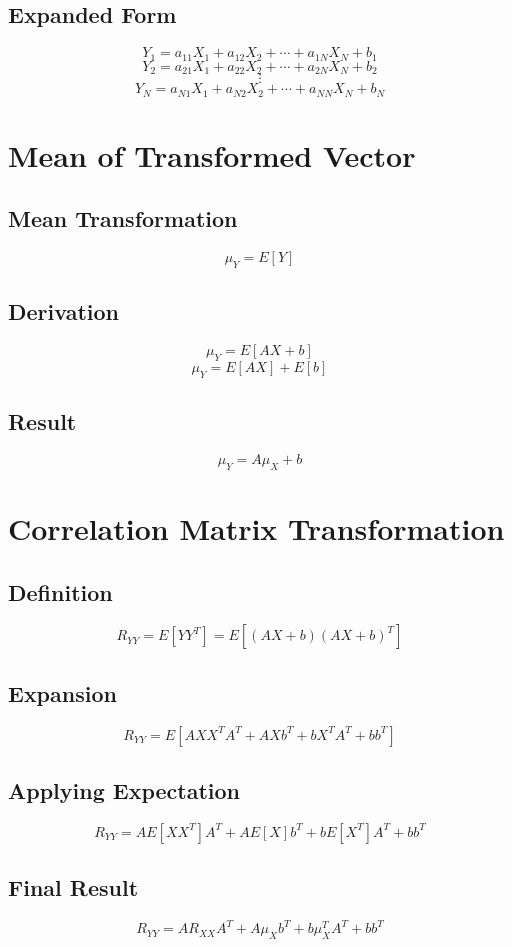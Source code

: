\documentclass[12pt]{article}
\begin{document}
\subsection{Expanded Form}
\[
Y_1 = a_{11}X_1 + a_{12}X_2 + \cdots + a_{1N}X_N + b_1
\]
\[
Y_2 = a_{21}X_1 + a_{22}X_2 + \cdots + a_{2N}X_N + b_2
\]
\[
\vdots
\]
\[
Y_N = a_{N1}X_1 + a_{N2}X_2 + \cdots + a_{NN}X_N + b_N
\]

\section{Mean of Transformed Vector}

\subsection{Mean Transformation}
\[
\mu_Y = E[Y]
\]

\subsection{Derivation}
\[
\mu_Y = E[AX + b]
\]
\[
\mu_Y = E[AX] + E[b]
\]

\subsection{Result}
\[
\mu_Y = A\mu_X + b
\]

\section{Correlation Matrix Transformation}

\subsection{Definition}
\[
R_{YY} = E[YY^T] = E[(AX + b)(AX + b)^T]
\]

\subsection{Expansion}
\[
R_{YY} = E[AXX^TA^T + AXb^T + bX^TA^T + bb^T]
\]

\subsection{Applying Expectation}
\[
R_{YY} = A E[XX^T] A^T + A E[X] b^T + b E[X^T] A^T + bb^T
\]

\subsection{Final Result}
\[
R_{YY} = A R_{XX} A^T + A \mu_X b^T + b \mu_X^T A^T + bb^T
\]
\end{document}
